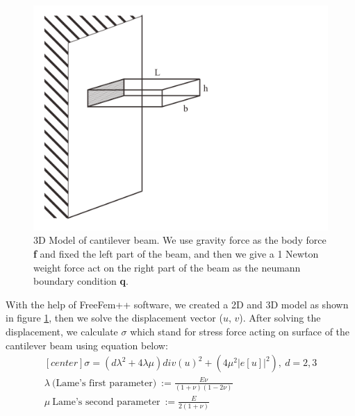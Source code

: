 \documentclass[a4paper,11pt]{article}
\begin{document}
\begin{figure}[h!]
	\centering
	\includegraphics[width=0.5\linewidth]{picture/3dmodellinearelasticity}
	\caption{3D Model of cantilever beam. We use gravity force as the body force \textbf{f} and fixed the left part of the beam, and then we give a 1 Newton weight force act on the right part of the beam as the neumann boundary condition \textbf{q}.}
	\label{fig:3dmodel}
\end{figure}
With the help of FreeFem++ software, we created a 2D and 3D model as shown in figure \ref{fig:3dmodel}, then we solve the displacement vector ($u$, $v$). After solving the displacement, we calculate $\sigma$ which stand for stress force acting on surface of the cantilever beam using equation below:
\begin{equation*}
\begin{aligned}[center]
\sigma = (d \lambda^2 + 4\lambda\mu)div(u)^2 + (4\mu^2 |e[u]|^2),\ d=2,3\\
\lambda\ \text{(Lame's first parameter)}\ := \frac{E\nu}{(1+\nu)(1-2\nu)}\\
\mu\ \text{Lame's second parameter}\ := \frac{E}{2(1+\nu)}
\end{aligned}
\end{equation*}
\newpage
\end{document}
